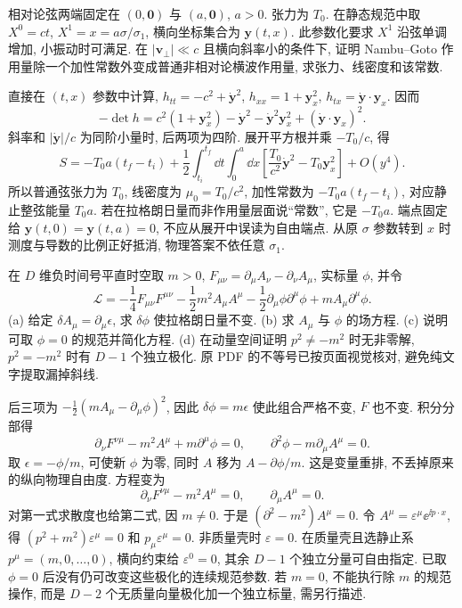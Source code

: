 \begin{exercise}
相对论弦两端固定在 $(0,\boldsymbol0)$ 与 $(a,\boldsymbol0)$, $a>0$. 张力为 $T_0$. 在静态规范中取 $X^0=ct$, $X^1=x=a\sigma/\sigma_1$, 横向坐标集合为 $\boldsymbol y(t,x)$. 此参数化要求 $X^1$ 沿弦单调增加, 小振动时可满足. 在 $|\boldsymbol v_\perp|\ll c$ 且横向斜率小的条件下, 证明 Nambu--Goto 作用量除一个加性常数外变成普通非相对论横波作用量, 求张力、线密度和该常数.
\end{exercise}
\begin{solution}
直接在 $(t,x)$ 参数中计算,
$h_{tt}=-c^2+\dot{\boldsymbol y}^2$,
$h_{xx}=1+\boldsymbol y_x^2$,
$h_{tx}=\dot{\boldsymbol y}\cdot\boldsymbol y_x$. 因而
\[
 -\det h=c^2(1+\boldsymbol y_x^2)-\dot{\boldsymbol y}^2
 -\dot{\boldsymbol y}^2\boldsymbol y_x^2
 +(\dot{\boldsymbol y}\cdot\boldsymbol y_x)^2.
\]
斜率和 $|\dot{\boldsymbol y}|/c$ 为同阶小量时, 后两项为四阶. 展开平方根并乘 $-T_0/c$, 得
\[
 S=-T_0a(t_f-t_i)+\frac12\int_{t_i}^{t_f}\dd t\int_0^a\dd x
 \left[\frac{T_0}{c^2}\dot{\boldsymbol y}^2-T_0\boldsymbol y_x^2\right]+O(y^4).
\]
所以普通弦张力为 $T_0$, 线密度为 $\mu_0=T_0/c^2$, 加性常数为 $-T_0a(t_f-t_i)$, 对应静止整弦能量 $T_0a$. 若在拉格朗日量而非作用量层面说“常数”, 它是 $-T_0a$. 端点固定给 $\boldsymbol y(t,0)=\boldsymbol y(t,a)=0$, 不应从展开中误读为自由端点. 从原 $\sigma$ 参数转到 $x$ 时测度与导数的比例正好抵消, 物理答案不依任意 $\sigma_1$.
\end{solution}

\begin{exercise}
在 $D$ 维负时间号平直时空取 $m>0$, $F_{\mu\nu}=\partial_\mu A_\nu-\partial_\nu A_\mu$, 实标量 $\phi$, 并令
\[
 \mathcal L=-\frac14F_{\mu\nu}F^{\mu\nu}-\frac12m^2A_\mu A^\mu
 -\frac12\partial_\mu\phi\partial^\mu\phi+mA_\mu\partial^\mu\phi.
\]
(a) 给定 $\delta A_\mu=\partial_\mu\epsilon$, 求 $\delta\phi$ 使拉格朗日量不变.
(b) 求 $A_\mu$ 与 $\phi$ 的场方程.
(c) 说明可取 $\phi=0$ 的规范并简化方程.
(d) 在动量空间证明 $p^2\ne-m^2$ 时无非零解, $p^2=-m^2$ 时有 $D-1$ 个独立极化. 原 PDF 的不等号已按页面视觉核对, 避免纯文字提取漏掉斜线.
\end{exercise}
\begin{solution}
后三项为 $-\frac12(mA_\mu-\partial_\mu\phi)^2$, 因此 $\delta\phi=m\epsilon$ 使此组合严格不变, $F$ 也不变. 积分分部得
\[
 \partial_\nu F^{\nu\mu}-m^2A^\mu+m\partial^\mu\phi=0,
 \qquad\partial^2\phi-m\partial_\mu A^\mu=0.
\]
取 $\epsilon=-\phi/m$, 可使新 $\phi$ 为零, 同时 $A$ 移为 $A-\partial\phi/m$. 这是变量重排, 不丢掉原来的纵向物理自由度. 方程变为
\[
 \partial_\nu F^{\nu\mu}-m^2A^\mu=0,
 \qquad\partial_\mu A^\mu=0.
\]
对第一式求散度也给第二式, 因 $m\ne0$. 于是 $(\partial^2-m^2)A^\mu=0$. 令 $A^\mu=\varepsilon^\mu\ee^{\ii p\cdot x}$, 得 $(p^2+m^2)\varepsilon^\mu=0$ 和 $p_\mu\varepsilon^\mu=0$. 非质量壳时 $\varepsilon=0$. 在质量壳且选静止系 $p^\mu=(m,0,\ldots,0)$, 横向约束给 $\varepsilon^0=0$, 其余 $D-1$ 个独立分量可自由指定. 已取 $\phi=0$ 后没有仍可改变这些极化的连续规范参数. 若 $m=0$, 不能执行除 $m$ 的规范操作, 而是 $D-2$ 个无质量向量极化加一个独立标量, 需另行描述.
\end{solution}

